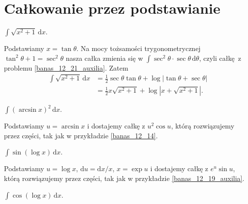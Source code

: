 \section{Całkowanie przez podstawianie}


\begin{integral}
    \label{banas_12_21}%
    $\int \sqrt{x^2 + 1} \, \mathrm{d}x$.
\end{integral}

\begin{solution}
    Podstawiamy $x = \tan \theta$.
    Na mocy tożsamości trygonometrycznej $\tan^2 \theta + 1 = \sec^2 \theta$ nasza całka zmienia się w $\int \sec^2 \theta \cdot \sec \theta \,\mathrm{d}\theta$, czyli całkę z problemu \ref{banas_12_21_auxilia}.
    Zatem
    \begin{align}
        \int \sqrt{x^2 + 1} \, \mathrm{d}x & = \frac 12 \sec \theta \tan \theta + \log |\tan \theta + \sec \theta| \\
        & = \frac 1 2 x \sqrt{x^2 + 1} + \log \left|x + \sqrt{x^2+1}\right|.
    \end{align}
\end{solution}


\begin{integral}
    \label{banas_12_18}%
    $\int (\arcsin x)^2 \,\mathrm{d}x$.
\end{integral}

\begin{solution}
    Podstawiamy $u = \arcsin x$ i dostajemy całkę z $u^2 \cos u$, którą rozwiązujemy przez części, tak jak w przykładzie \ref{banas_12_14}.
\end{solution}

\begin{integral}
    \label{banas_12_19}%
    $\int \sin(\log x) \, \mathrm{d}x$.
\end{integral}

\begin{solution}
    Podstawiamy $u = \log x$, $\mathrm{d} u = \mathrm{d} x / x$, $x = \exp u$ i dostajemy całkę z $e^u \sin u$, którą rozwiązujemy przez części, tak jak w przykładzie \ref{banas_12_19_auxilia}.
\end{solution}

\begin{integral}
    \label{banas_12_20}%
    $\int \cos(\log x) \, \mathrm{d}x$.
\end{integral}    

